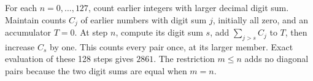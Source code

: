 For each $n=0,\ldots,127$, count earlier integers with larger decimal digit sum. Maintain counts $C_j$ of earlier numbers with digit sum $j$, initially all zero, and an accumulator $T=0$. At step $n$, compute its digit sum $s$, add $\sum_{j>s}C_j$ to $T$, then increase $C_s$ by one. This counts every pair once, at its larger member. Exact evaluation of these 128 steps gives $\boxed{2861}$. The restriction $m\le n$ adds no diagonal pairs because the two digit sums are equal when $m=n$.
